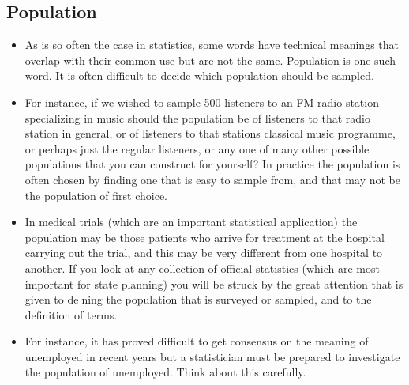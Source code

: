 ﻿\documentclass[]{report}
\begin{document}
\subsection{Population}
\begin{itemize}
\item As is so often the case in statistics, some words have technical meanings that overlap with their common use but are not the same. Population is one such word. It is often difficult to decide which population should be sampled. 

\item For instance, if we wished to sample 500 listeners to an FM radio station specializing in music should the population be of listeners to that radio station in general, or of listeners to that stations classical music programme, or perhaps just the regular listeners, or any one of many other possible populations that you can construct for yourself? In practice the population is often chosen by finding one that is easy to sample from, and that may not be the population of first choice.

\item 
In medical trials (which are an important statistical application) the population may be those patients who arrive for treatment at the hospital carrying out the trial, and this may be very different from one hospital to another. If you look at any collection of official statistics (which
are most important for state planning) you will be struck by the great attention that is given to dening the population that is surveyed or sampled, and to the definition of terms. 


\item For instance, it has proved difficult to get consensus on the meaning of unemployed in recent years but a statistician must be prepared to investigate the population of unemployed. Think about this carefully.
\end{itemize}
\bigskip
\end{document}
